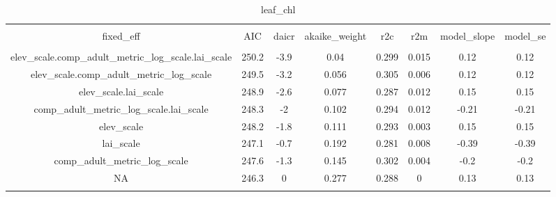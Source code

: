 
\begin{table}[!htbp] \centering 
  \caption{leaf_chl} 
  \label{leaf_chl} 
\begin{tabular}{@{\extracolsep{5pt}} cccccccc} 
\\[-1.8ex]\hline 
\hline \\[-1.8ex] 
fixed\_eff & AIC & daicr & akaike\_weight & r2c & r2m & model\_slope & model\_se \\ 
\hline \\[-1.8ex] 
elev\_scale.comp\_adult\_metric\_log\_scale.lai\_scale & 250.2 & -3.9 & 0.04 & 0.299 & 0.015 & 0.12 & 0.12 \\ 
elev\_scale.comp\_adult\_metric\_log\_scale & 249.5 & -3.2 & 0.056 & 0.305 & 0.006 & 0.12 & 0.12 \\ 
elev\_scale.lai\_scale & 248.9 & -2.6 & 0.077 & 0.287 & 0.012 & 0.15 & 0.15 \\ 
comp\_adult\_metric\_log\_scale.lai\_scale & 248.3 & -2 & 0.102 & 0.294 & 0.012 & -0.21 & -0.21 \\ 
elev\_scale & 248.2 & -1.8 & 0.111 & 0.293 & 0.003 & 0.15 & 0.15 \\ 
lai\_scale & 247.1 & -0.7 & 0.192 & 0.281 & 0.008 & -0.39 & -0.39 \\ 
comp\_adult\_metric\_log\_scale & 247.6 & -1.3 & 0.145 & 0.302 & 0.004 & -0.2 & -0.2 \\ 
NA & 246.3 & 0 & 0.277 & 0.288 & 0 & 0.13 & 0.13 \\ 
\hline \\[-1.8ex] 
\end{tabular} 
\end{table} 
